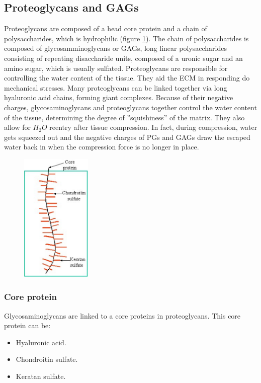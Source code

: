 	\subsection{Proteoglycans and GAGs}
	Proteoglycans are composed of a head core protein and a chain of polysaccharides, which is hydrophilic (figure \ref{fig:pgag}).
	The chain of polysaccharides is composed of glycosamminoglycans or GAGs, long linear polysaccharides consisting of repeating disaccharide units, composed of a uronic sugar and an amino sugar, which is usually sulfated.
	Proteoglycans are responsible for controlling the water content of the tissue.
	They aid the ECM in responding do mechanical stresses.
	Many proteoglycans can be linked together via long hyaluronic acid chains, forming giant complexes.
	Because of their negative charges, glycosaminoglycans and proteoglycans together control the water content of the tissue, determining the degree of ”squishiness” of the matrix.
	They also allow for $H_2O$ reentry after tissue compression.
	In fact, during compression, water gets squeezed out and the negative charges of PGs and GAGs draw the escaped water back in when the compression force is no longer in place.

	\begin{figure}[ht]
		\centering
		\includegraphics[width=0.3\textwidth]{pgag}
		\caption{\label{fig:pgag}}
	\end{figure}


		\subsubsection{Core protein}
		Glycosaminoglycans are linked to a core proteins in proteoglycans.
		This core protein can be:

		\begin{multicols}{2}
			\begin{itemize}
				\item Hyaluronic acid.
				\item Chondroitin sulfate.
				\item Keratan sulfate.
			\end{itemize}
		\end{multicols}

